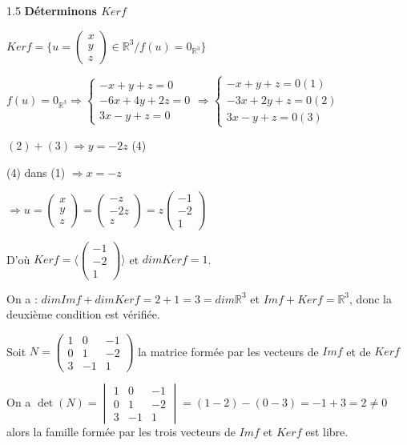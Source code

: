 \documentclass[12pt]{article}
\begin{document}
\begin{spacing}{1.5}
\medskip
\textbf{Déterminons $Kerf$}

$Kerf=\{u=\begin{pmatrix}
x\\
y\\
z
\end{pmatrix}\in \mathbb{R}^3/f(u)=0_{\mathbb{R}^3}\}$

$f(u)=0_{\mathbb{R}^3}\Rightarrow \begin{cases}
-x+y+z=0\\
-6x+4y+2z=0\\
3x-y+z=0
\end{cases}\Rightarrow \begin{cases}
-x+y+z=0(1)\\
-3x+2y+z=0(2)\\
3x-y+z=0(3)
\end{cases}$

$(2)+(3)\Rightarrow y=-2z$ (4)

(4) dans (1) $\Rightarrow x=-z$

$\Rightarrow u=\begin{pmatrix}
x\\
y\\
z
\end{pmatrix}=\begin{pmatrix}
-z\\
-2z\\
z
\end{pmatrix}=z\begin{pmatrix}
-1 \\
-2 \\
1
\end{pmatrix}$

D'où $Kerf=\langle \begin{pmatrix}
-1\\
-2\\
1
\end{pmatrix}\rangle$ et $dimKerf=1$.

\medskip
On a : $dimImf+dimKerf=2+1=3=dim\mathbb{R}^3$ et $Imf+Kerf=\mathbb{R}^3$, donc la deuxième condition est vérifiée.

\medskip
Soit $N=\begin{pmatrix}
1 & 0  & -1 \\ 
0 & 1  & -2 \\ 
3 & -1 & 1 
\end{pmatrix}$ la matrice formée par les vecteurs de $Imf$ et de $Kerf$

On a $\det(N)=\begin{vmatrix}
1 & 0  & -1 \\ 
0 & 1  & -2 \\ 
3 & -1 & 1 
\end{vmatrix}=(1-2)-(0-3)=-1+3=2\neq 0$ alors la famille formée par les trois vecteurs de $Imf$ et $Kerf$ est libre.


\end{spacing}
\end{document}
